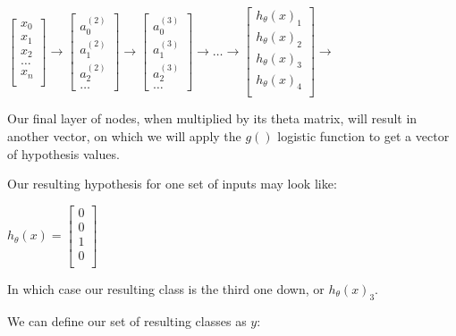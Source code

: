 \documentclass{article}
\begin{document}
$
\begin{bmatrix}
x_0 \\
x_1 \\
x_2 \\
\dots \\
x_n \\
\end{bmatrix}
\to
\begin{bmatrix}
a_0^{(2)} \\
a_1^{(2)} \\
a_2^{(2)} \\
\dots
\end{bmatrix}
\to
\begin{bmatrix}
a_0^{(3)} \\
a_1^{(3)} \\
a_2^{(3)} \\
\dots
\end{bmatrix}
\to
\dots
\to
\begin{bmatrix}
h_\theta(x)_1 \\
h_\theta(x)_2 \\
h_\theta(x)_3 \\
h_\theta(x)_4 \\
\end{bmatrix}
\to
$

Our final layer of nodes, when multiplied by its theta matrix, will result in another vector, on which we will apply the $g()$ logistic function to get a vector of hypothesis values.

Our resulting hypothesis for one set of inputs may look like:

$h_\theta(x)=
\begin{bmatrix}
0 \\
0 \\
1 \\
0 \\
\end{bmatrix}
$

In which case our resulting class is the third one down, or $h_\theta(x)_3$.

We can define our set of resulting classes as $y$:
\end{document}
